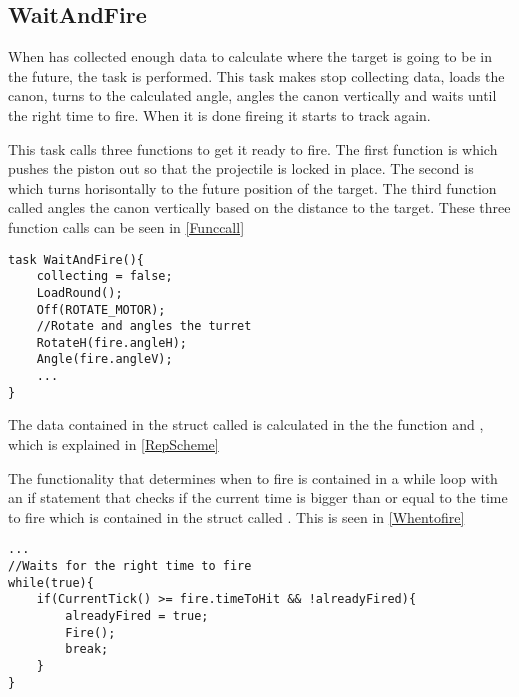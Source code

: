 \subsection{WaitAndFire}
When \name has collected enough data to calculate where the target is going to
be in the future, the task  is performed. This task makes
\name stop collecting data, loads the canon, turns to the calculated angle, angles the
canon vertically and waits until the right time to fire. When it is done fireing
it starts to track again.\nl

This task calls three functions to get it ready to fire. The first function is
 which pushes the piston out so that the projectile is locked
in place. The second is  which turns \name horisontally to the
future position of the target. The third function called  angles
the canon vertically based on the distance to the target. These three function calls can be seen in
\autoref{Funccall}\nl

\begin{minipage}[H]{\linewidth}
\begin{lstlisting}[caption = Function calls in WaitAndFire, label = Funccall] 
task WaitAndFire(){
	collecting = false;
    LoadRound();
    Off(ROTATE_MOTOR);
    //Rotate and angles the turret
    RotateH(fire.angleH);
    Angle(fire.angleV);
    ...
}
\end{lstlisting}
\end{minipage}

The data contained in the struct called  is calculated in the the
function  and , which is explained in
\autoref{RepScheme}

The functionality that determines when to fire is contained in a while loop with
an if statement that checks if the current time is bigger than or equal to the
time to fire which is contained in the struct called . This is seen
in \autoref{Whentofire}\nl
 
\begin{minipage}[H]{\linewidth}
\begin{lstlisting}[caption = While loop that determines when to fire, label =
Whentofire]
 ...
//Waits for the right time to fire
while(true){
	if(CurrentTick() >= fire.timeToHit && !alreadyFired){
    	alreadyFired = true;
        Fire();
        break;
    }
}
\end{lstlisting}
\end{minipage}





